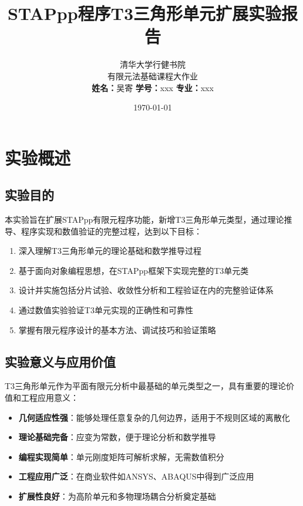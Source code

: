 \documentclass[12pt,a4paper]{article}
\title{\textbf{STAPpp程序T3三角形单元扩展实验报告}}
\author{清华大学行健书院 \\ 有限元法基础课程大作业 \\ 
        \textbf{姓名：}吴寄 \quad \textbf{学号：}xxx \quad \textbf{专业：}xxx}
\date{\today}
\begin{document}
\maketitle

\tableofcontents
\newpage

\section{实验概述}

\subsection{实验目的}

本实验旨在扩展STAPpp有限元程序功能，新增T3三角形单元类型，通过理论推导、程序实现和数值验证的完整过程，达到以下目标：

\begin{enumerate}
    \item 深入理解T3三角形单元的理论基础和数学推导过程
    \item 基于面向对象编程思想，在STAPpp框架下实现完整的T3单元类
    \item 设计并实施包括分片试验、收敛性分析和工程验证在内的完整验证体系
    \item 通过数值实验验证T3单元实现的正确性和可靠性
    \item 掌握有限元程序设计的基本方法、调试技巧和验证策略
\end{enumerate}

\subsection{实验意义与应用价值}

T3三角形单元作为平面有限元分析中最基础的单元类型之一，具有重要的理论价值和工程应用意义：

\begin{itemize}
    \item \textbf{几何适应性强}：能够处理任意复杂的几何边界，适用于不规则区域的离散化
    \item \textbf{理论基础完备}：应变为常数，便于理论分析和数学推导
    \item \textbf{编程实现简单}：单元刚度矩阵可解析求解，无需数值积分
    \item \textbf{工程应用广泛}：在商业软件如ANSYS、ABAQUS中得到广泛应用
    \item \textbf{扩展性良好}：为高阶单元和多物理场耦合分析奠定基础
\end{itemize}
\end{document}
